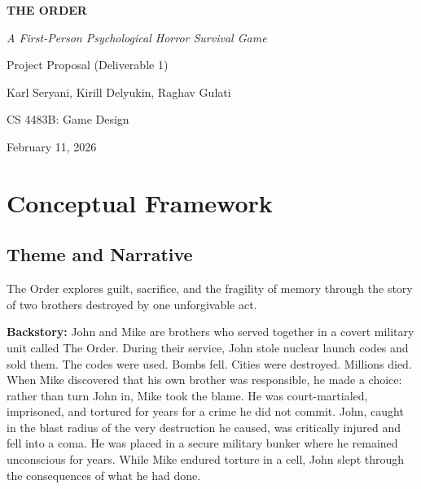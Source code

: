 \documentclass[12pt, letterpaper]{article}
\begin{document}
\begin{center}
    {\Huge\bfseries\color{darkblue} THE ORDER}

    \vspace{0.3cm}

    {\Large\itshape A First-Person Psychological Horror Survival Game}

    \vspace{1cm}

    {\large Project Proposal (Deliverable 1)}

    \vspace{0.5cm}

    {\large Karl Seryani, Kirill Delyukin, Raghav Gulati}

    \vspace{0.3cm}

    {\large CS 4483B: Game Design}

    {\large February 11, 2026}
\end{center}

\vspace{0.8cm}

\section{Conceptual Framework}

\subsection{Theme and Narrative}

The Order explores guilt, sacrifice, and the fragility of memory through the story of two brothers destroyed by one unforgivable act.

\textbf{Backstory:} John and Mike are brothers who served together in a covert military unit called The Order. During their service, John stole nuclear launch codes and sold them. The codes were used. Bombs fell. Cities were destroyed. Millions died. When Mike discovered that his own brother was responsible, he made a choice: rather than turn John in, Mike took the blame. He was court-martialed, imprisoned, and tortured for years for a crime he did not commit. John, caught in the blast radius of the very destruction he caused, was critically injured and fell into a coma. He was placed in a secure military bunker where he remained unconscious for years. While Mike endured torture in a cell, John slept through the consequences of what he had done.
\end{document}
